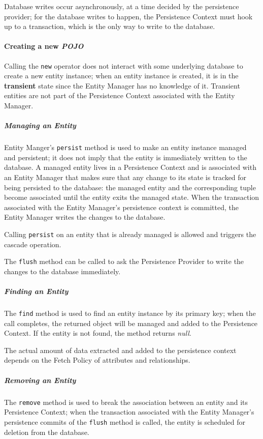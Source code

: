 \documentclass[english]{article}
\begin{document}
Database writes occur asynchronously, at a time decided by the persistence provider;
for the database writes to happen, the Persistence Context must hook up to a transaction, which is the only way to write to the database.

\paragraph{Creating a new \textit{POJO}}

Calling the \texttt{new} operator does not interact with some underlying database to create a new entity instance;
when an entity instance is created, it is in the \textbf{transient} state since the Entity Manager has no knowledge of it.
Transient entities are not part of the Persistence Context associated with the Entity Manager.

\subparagraph*{Managing an Entity}
Entity Manger's \texttt{persist} method is used to make an entity instance managed and persistent; it does not imply that the entity is immediately written to the database.
A managed entity lives in a Persistence Context and is associated with an Entity Manager that makes sure that any change to its state is tracked for being persisted to the database:
the managed entity and the corresponding tuple become associated until the entity exits the managed state.
When the transaction associated with the Entity Manager's persistence context is committed, the Entity Manager writes the changes to the database.

Calling \texttt{persist} on an entity that is already managed is allowed and triggers the cascade operation.

The \texttt{flush} method can be called to ask the Persistence Provider to write the changes to the database immediately.

\subparagraph*{Finding an Entity}
The \texttt{find} method is used to find an entity instance by its primary key;
when the call completes, the returned object will be managed and added to the Persistence Context.
If the entity is not found, the method returns \textit{null}.

The actual amount of data extracted and added to the persistence context depends on the Fetch Policy of attributes and relationships.

\subparagraph*{Removing an Entity}
The \texttt{remove} method is used to break the association between an entity and its Persistence Context;
when the transaction associated with the Entity Manager's persistence commits of the \texttt{flush} method is called, the entity is scheduled for deletion from the database.
\end{document}

